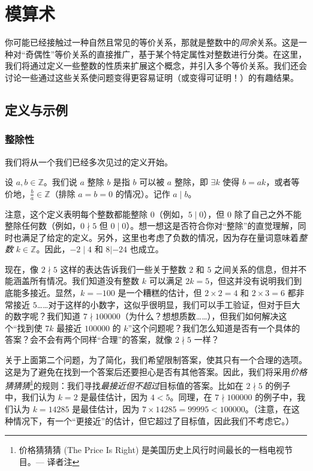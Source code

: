 \section{模算术}

你可能已经接触过一种自然且常见的等价关系，那就是整数中的\emph{同余}关系。这是一种对``奇偶性''等价关系的直接推广，基于某个特定属性对整数进行分类。在这里，我们将通过定义一些整数的性质来扩展这个概念，并引入多个等价关系。我们还会讨论一些通过这些关系使问题变得更容易证明（或变得可证明！）的有趣结果。

\subsection{定义与示例}

\subsubsection*{整除性}

我们将从一个我们已经多次见过的定义开始。

\begin{definition}
    设 $a,b \in \mathbb{Z}$。我们说 $a$ 整除 $b$ 是指 $b$ 可以被 $a$ 整除，即 $\exists k$ 使得 $b = ak$，或者等价地，$\frac{b}{a} \in \mathbb{Z}$（排除 $a=b=0$ 的情况）。记作 $a \mid b$。
\end{definition}

注意，这个定义表明每个整数都能整除 $0$（例如，$5 \mid 0$），但 $0$ 除了自己之外不能整除任何数（例如，$0 \nmid 5$ 但 $0 \mid 0$）。想一想这是否符合你对``整除''的直觉理解，同时也满足了给定的定义。另外，这里也考虑了负数的情况，因为存在量词意味着\emph{整数} $k \in \mathbb{Z}$。因此，$-2 \mid 4$ 和 $8 | -24$ 也成立。

现在，像 $2 \nmid 5$ 这样的表达告诉我们一些关于整数 $2$ 和 $5$ 之间关系的信息，但并不能涵盖所有情况。我们知道没有整数 $k$ 可以满足 $2k = 5$，但这并没有说明我们到底能多接近。显然，$k = -100$ 是一个糟糕的估计，但 $2 \times 2 = 4$ 和 $2 \times 3 = 6$ 都非常接近 $5$……对于这样的小数字，这似乎很明显，我们可以手工验证，但对于巨大的数字呢？我们知道 $7 \nmid 100000$（为什么？想想质数……），但我们如何解决这个``找到使 $7k$ 最接近 $100000$ 的 $k$''这个问题呢？我们怎么知道是否有一个具体的答案？会不会有两个同样``合理''的答案，就像 $2 \nmid 5$ 一样？

关于上面第二个问题，为了简化，我们希望限制答案，使其只有一个合理的选项。这是为了避免在找到一个答案后还要担心是否有其他答案。因此，我们将采用\emph{价格猜猜猜}\footnote{价格猜猜猜 (The Price Is Right) 是美国历史上风行时间最长的一档电视节目。--- 译者注}的规则：我们寻找\emph{最接近但不超过}目标值的答案。比如在 $2 \nmid 5$ 的例子中，我们认为 $k = 2$ 是最佳估计，因为 $4 < 5$。同理，在 $7 \nmid 100000$ 的例子中，我们认为 $k = 14285$ 是最佳估计，因为 $7 \times 14285 = 99995 < 100000$。（注意，在这种情况下，有一个``更接近''的估计，但它超过了目标值，因此我们不考虑它。）


